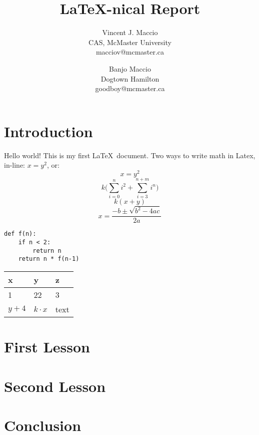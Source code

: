 \documentclass[twocolumn, 10pt]{article}
\title{\LaTeX -nical Report}
\author{Vincent J. Maccio\\ CAS, McMaster University\\ macciov@mcmaster.ca \and Banjo Maccio\\ Dogtown Hamilton\\ goodboy@mcmaster.ca}
\begin{document}
\maketitle
{}
\section{Introduction}\label{sec:intro}
Hello world! This is my first \LaTeX\ document. Two ways to write math in Latex, in-line: $x = y^2$, or: $$x = y^2$$
$$
k\bigg( \sum_{i=0}^{n}i^2 + \sum_{i=3}^{n + m} i^n \bigg)
$$
$$
k(x + y)
$$
$$ x = \frac{-b \pm \sqrt{b^{2} - 4ac}}{2a} $$
\begin{verbatim}
def f(n):
    if n < 2:
        return n
    return n * f(n-1)
\end{verbatim}
\begin{center}
\begin{table}[!h]
\begin{tabular}{|l|l|l|}
\hline
x     & y          & z    \\ \hline
1     & 22         & 3    \\ \hline
$y+4$ & $k\cdot x$ & text \\ \hline
\end{tabular}
\end{table}
\end{center}

\section{First Lesson}
\section{Second Lesson}
\section{Conclusion}
\end{document}
